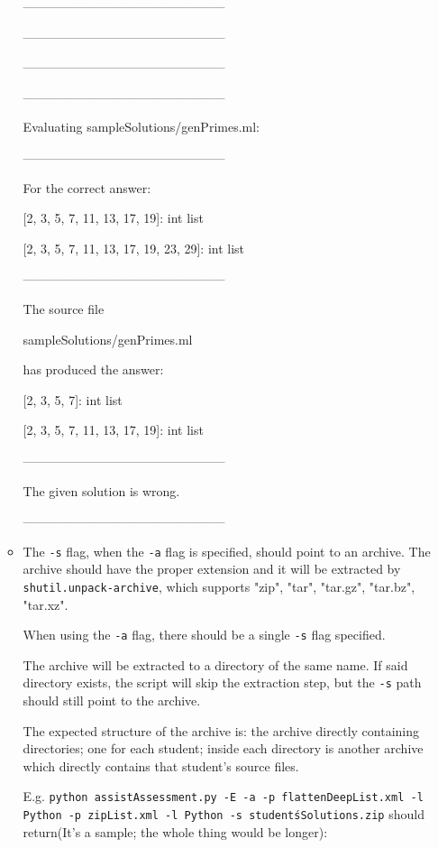 \documentclass[a4paper,12pt]{article}
\begin{document}
\begin{itemize}
\begin{itemize}
------------------------------------------------

------------------------------------------------

------------------------------------------------

------------------------------------------------

        Evaluating sampleSolutions/genPrimes.ml:

------------------------------------------------

For the correct answer:

[2, 3, 5, 7, 11, 13, 17, 19]: int list

[2, 3, 5, 7, 11, 13, 17, 19, 23, 29]: int list

------------------------------------------------

The source file 

        sampleSolutions/genPrimes.ml

has produced the answer:

[2, 3, 5, 7]: int list

[2, 3, 5, 7, 11, 13, 17, 19]: int list

------------------------------------------------

The given solution is wrong.

------------------------------------------------
 
  \item
   The \texttt{-s} flag, when the \texttt{-a} flag is specified, should point to an archive. The archive should have the proper extension and it will be extracted by \texttt{shutil.unpack-archive}, which supports "zip", "tar", "tar.gz", "tar.bz", "tar.xz". 
   
   When using the \texttt{-a} flag, there should be a single \texttt{-s} flag specified.
   
   The archive will be extracted to a directory of the same name. If said directory exists, the script will skip the extraction step, but the \texttt{-s} path should still point to the archive.
   
   The expected structure of the archive is: the archive directly containing directories; one for each student; inside each directory is another archive which directly contains that student's source files.
   
   E.g. \texttt{python assistAssessment.py -E -a -p flattenDeepList.xml -l Python -p zipList.xml -l Python -s student\'sSolutions.zip} should return(It's a sample; the whole thing would be longer): 
   

\end{itemize}
\end{itemize}
\end{document}
